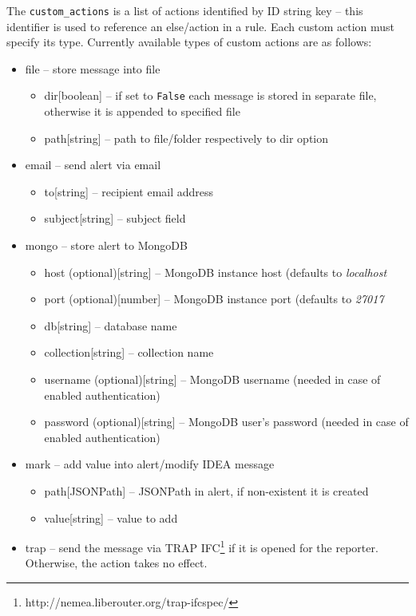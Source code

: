 \documentclass[11pt,a4paper]{article}
\begin{document}
The \texttt{custom\_actions} is a list of actions identified by ID string key -- this identifier is used to reference an else/action in a rule. Each custom action must specify its type. Currently available types of custom actions are as follows:

\begin{itemize}
		\label{actions}

	\item{file -- store message into file}
		\begin{itemize}
			\item{dir[boolean] -- if set to \texttt{False} each message is stored in separate file, otherwise it is appended to specified file}
			\item{path[string] -- path to file/folder respectively to dir option}
		\end{itemize}
	\item{email -- send alert via email}
		\begin{itemize}
			\item{to[string] -- recipient email address}
			\item{subject[string] -- subject field}
		\end{itemize}
	\item{mongo -- store alert to MongoDB}
		\begin{itemize}
			\item{host (optional)[string] -- MongoDB instance host (defaults to \textit{localhost}}
			\item{port (optional)[number] -- MongoDB instance port (defaults to \textit{27017}}
			\item{db[string] -- database name}
			\item{collection[string] -- collection name}
			\item{username (optional)[string] -- MongoDB username (needed in case of enabled authentication)}
			\item{password (optional)[string] -- MongoDB user's password (needed in case of enabled authentication)}
		\end{itemize}
	\item{mark -- add value into alert/modify IDEA message}
		\begin{itemize}
			\item{path[JSONPath] -- JSONPath in alert, if non-existent it is created}
			\item{value[string] -- value to add}
		\end{itemize}
	\item{trap -- send the message via TRAP IFC\footnote{http://nemea.liberouter.org/trap-ifcspec/} if it is opened for the reporter. Otherwise, the action takes no effect.}

\end{itemize}
\end{document}
